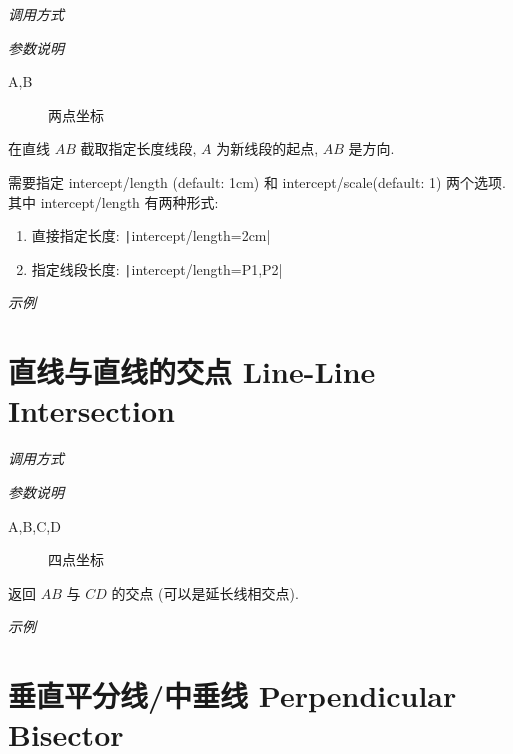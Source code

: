 \emph{调用方式}

\begin{tcolorbox}{}
\end{tcolorbox}

\emph{参数说明}

\begin{description}
  \item[A,B] 两点坐标
\end{description}

在直线 $AB$ 截取指定长度线段, $A$ 为新线段的起点, $AB$ 是方向.

需要指定 intercept/length (default: 1cm) 和 intercept/scale(default: 1) 两个选项.
其中 intercept/length 有两种形式:

\begin{enumerate}
  \item 直接指定长度: \texttt|intercept/length=2cm|
  \item 指定线段长度: \texttt|intercept/length={P1,P2}|
\end{enumerate}

\emph{示例}



\section{直线与直线的交点 Line-Line Intersection}

\emph{调用方式}

\begin{tcolorbox}{}
\end{tcolorbox}

\emph{参数说明}

\begin{description}
  \item[A,B,C,D] 四点坐标 
\end{description}

返回 $AB$ 与 $CD$ 的交点 (可以是延长线相交点).

\emph{示例}


\section{垂直平分线/中垂线 Perpendicular Bisector}

